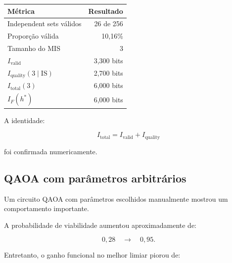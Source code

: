 \documentclass[11pt,a4paper]{article}
\begin{document}
\begin{center}

\renewcommand{\arraystretch}{1.4}

\begin{tabularx}{0.90\textwidth}{X r}

\toprule

\textbf{Métrica}
&
\textbf{Resultado}
\\

\midrule

Independent sets válidos
&
26 de 256
\\

Proporção válida
&
10{,}16\%
\\

Tamanho do MIS
&
3
\\

$I_{\mathrm{valid}}$
&
3{,}300 bits
\\

$I_{\mathrm{quality}}(3\mid\mathrm{IS})$
&
2{,}700 bits
\\

$I_{\mathrm{total}}(3)$
&
6{,}000 bits
\\

$I_F(h^*)$
&
6{,}000 bits
\\

\bottomrule

\end{tabularx}

\end{center}

A identidade:

\[
I_{\mathrm{total}}
=
I_{\mathrm{valid}}
+
I_{\mathrm{quality}}
\]

foi confirmada numericamente.

\subsection{QAOA com parâmetros arbitrários}

Um circuito QAOA com parâmetros escolhidos manualmente mostrou
um comportamento importante.

A probabilidade de viabilidade aumentou aproximadamente de:

\[
0{,}28
\quad\longrightarrow\quad
0{,}95.
\]

Entretanto, o ganho funcional no melhor limiar piorou de:
\end{document}
